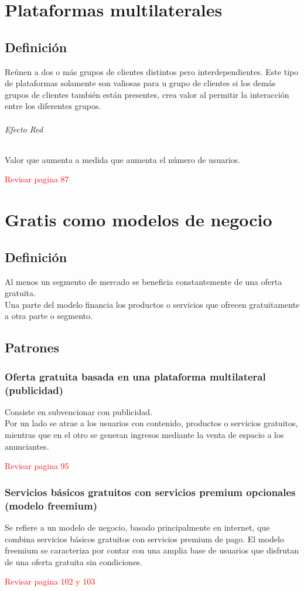 \documentclass[11pt]{book}
\begin{document}
\chapter{Plataformas multilaterales}
\section{Definición}
Reúnen a dos o más grupos de clientes distintos pero interdependientes. Este tipo de plataformas solamente son valiosas para u grupo de clientes si los demás grupos de clientes también están presentes, crea valor al permitir la interacción entre los diferentes grupos.
\subparagraph{Efecto Red}
Valor que aumenta a medida que aumenta el número de usuarios.
\begin{flushright}
\textcolor{red}{Revisar pagina 87}
\end{flushright}
\chapter{Gratis como modelos de negocio}
\section{Definición}
Al menos un segmento de mercado se beneficia constantemente de una oferta gratuita.\\ Una parte del modelo financia los productos o servicios que ofrecen gratuitamente a otra parte o segmento.
\section{Patrones}
\subsection{Oferta gratuita basada en una plataforma multilateral (publicidad)}
Consiste en subvencionar con publicidad.\\
Por un lado se atrae a los usuarios con contenido, productos o servicios gratuitos, mientras que en el otro se generan ingresos mediante la venta de espacio a los anunciantes.
\begin{flushright}
\textcolor{red}{Revisar pagina 95}
\end{flushright} 
\subsection{Servicios básicos gratuitos con servicios premium opcionales (modelo freemium)}
Se refiere a un modelo de negocio, basado principalmente en internet, que combina servicios básicos gratuitos con servicios premium de pago. El modelo freemium se caracteriza por contar con una amplia base de usuarios que disfrutan de una oferta gratuita sin condiciones.
\begin{flushright}
\textcolor{red}{Revisar pagina 102 y 103}
\end{flushright} 
\end{document}
